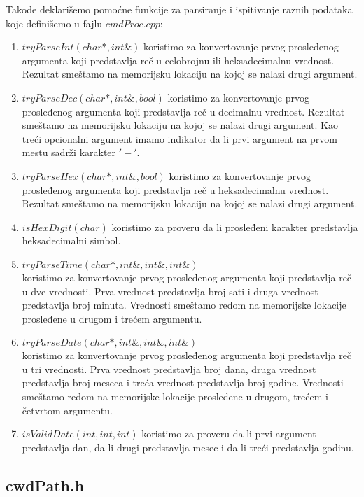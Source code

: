 \documentclass[a4paper]{extarticle}
\begin{document}
	
	Takođe deklarišemo pomoćne funkcije za parsiranje i ispitivanje raznih podataka koje definišemo u fajlu $cmdProc.cpp$:
	\begin{enumerate}
		\item $tryParseInt(char*, int\&)$ koristimo za konvertovanje prvog prosleđenog argumenta koji predstavlja reč u celobrojnu ili heksadecimalnu vrednost. Rezultat smeštamo na memorijsku lokaciju na kojoj se nalazi drugi argument.
		\item $tryParseDec(char*, int\&, bool)$ koristimo za konvertovanje  prvog prosleđenog argumenta koji predstavlja reč u decimalnu vrednost. Rezultat smeštamo na memorijsku lokaciju na kojoj se nalazi drugi argument. Kao treći opcionalni argument imamo indikator da li prvi argument na prvom mestu sadrži karakter $'-'$.
		\item $tryParseHex(char*, int\&, bool)$ koristimo za konvertovanje  prvog prosleđenog argumenta koji predstavlja reč u heksadecimalnu vrednost. Rezultat smeštamo na memorijsku lokaciju na kojoj se nalazi drugi argument.
		\item $isHexDigit(char)$ koristimo za proveru da li prosleđeni karakter predstavlja heksadecimalni simbol.
		
		\item $tryParseTime(char*, int\&, int\&, int\&)$\\ koristimo za konvertovanje  prvog prosleđenog argumenta koji predstavlja reč u dve vrednosti. Prva vrednost predstavlja broj sati i druga vrednost predstavlja broj minuta. Vrednosti smeštamo redom na memorijske lokacije prosleđene u drugom i trećem argumentu.
		
		\item $tryParseDate(char*, int\&, int\&, int\&)$\\ koristimo za konvertovanje  prvog prosleđenog argumenta koji predstavlja reč u tri vrednosti. Prva vrednost predstavlja broj dana, druga vrednost predstavlja broj meseca i treća vrednost predstavlja broj godine. Vrednosti smeštamo redom na memorijske lokacije prosleđene u drugom, trećem i četvrtom argumentu.
		
		
		\item $isValidDate(int, int ,int)$ koristimo za proveru da li prvi argument predstavlja dan, da li drugi predstavlja mesec i da li treći predstavlja godinu.
		
	\end{enumerate}

	\subsection{cwdPath.h}
	
\end{document}
